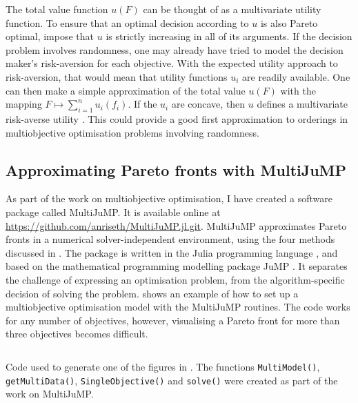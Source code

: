 \documentclass[main.tex]{subfiles}
\begin{document}
The total value function $u(F)$ can be thought of as a
multivariate utility function. To ensure that an optimal decision
according to $u$ is also Pareto optimal, impose that $u$ is
strictly increasing in all of its arguments.
If the decision problem involves randomness, one may already have
tried to model the decision maker's risk-aversion for each objective.
With the expected utility approach to risk-aversion, that would mean
that utility functions $u_i$ are readily available. One can then make
a simple approximation of
the total value $u(F)$ with the mapping $F\mapsto \sum_{i=1}^n u_i(f_i)$.
If the $u_i$ are concave, then $u$ defines a multivariate risk-averse
utility \citep[Sec. 2.3.2]{campi2011multivariate}.
This could provide a good first approximation to orderings in
multiobjective optimisation problems involving randomness.


\subsection{Approximating Pareto fronts with
  MultiJuMP}\label{sec:one_multijump}
As part of the work on multiobjective optimisation, I have created a
software package called MultiJuMP.  It is available online at
\url{https://github.com/anriseth/MultiJuMP.jl.git}.  MultiJuMP
approximates Pareto fronts in a numerical solver-independent
environment, using the four methods discussed in
.  The package is written in the Julia
programming language \citep{bezanson2017julia}, and based on the
mathematical programming modelling package JuMP
\citep{dunning2017jump}. It separates the challenge of expressing an
optimisation problem, from the algorithm-specific decision of solving
the problem.  shows an example of how to set up a
multiobjective optimisation model with the MultiJuMP routines. The
code works for any number of objectives, however, visualising a Pareto
front for more than three objectives becomes difficult.
\begin{listing}[htbp]
  \inputminted{julia}{./include/multijump.jl}
  \caption{Code used to generate one of the figures in
    .
    The functions \texttt{MultiModel()},
    \texttt{getMultiData()},
    \texttt{SingleObjective()} and \texttt{solve()}
    were created as part of the work on MultiJuMP.
  }\label{lst:multijump}
\end{listing}




\biblio{} %
\end{document}
